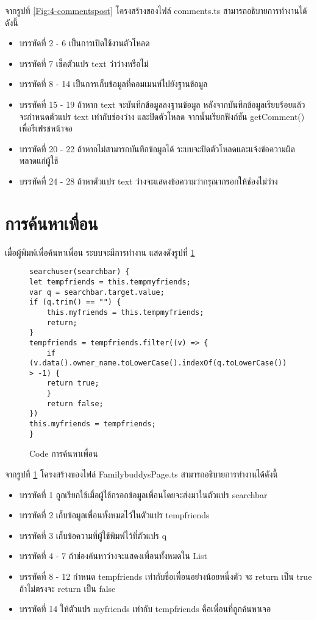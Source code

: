 จากรูปที่ \ref{Fig:4-commentspost} โครงสร้างของไฟล์ comments.ts สามารถอธิบายการทำงานได้ดังนี้
\begin{itemize}[label={--}]
\item บรรทัดที่ 2 - 6 เป็นการเปิดใช้งานตัวโหลด
\item บรรทัดที่ 7 เช็คตัวแปร text ว่าว่างหรือไม่
\item บรรทัดที่ 8 - 14 เป็นการเก็บข้อมูลที่คอมเมนท์ไปยังฐานข้อมูล
\item บรรทัดที่ 15 - 19 ถ้าหาก text จะบันทึกข้อมูลลงฐานข้อมูล หลังจากบันทึกข้อมูลเรียบร้อยแล้ว จะกำหนดตัวแปร text เท่ากับช่องว่าง และปิดตัวโหลด จากนั้นเรียกฟังก์ชัน getComment() เพื่อรีเฟรชหน้าจอ
\item บรรทัดที่ 20 - 22 ถ้าหากไม่สามารถบันทึกข้อมูลได้ ระบบจะปิดตัวโหลดและแจ้งข้อความผิดพลาดแก่ผู้ใช้
\item บรรทัดที่ 24 - 28 ถ้าหาตัวแปร text ว่างจะแสดงข้อความว่ากรุณากรอกให้ช่องไม่ว่าง
\end{itemize}
\newpage





\section{การค้นหาเพื่อน}
เมื่อผู้พิมพ์เพื่อค้นหาเพื่อน ระบบจะมีการทำงาน แสดงดังรูปที่ \ref{Fig:4-addfamily}

\begin{figure}[H]
{\lstset{language=Pascal}
\begin{lstlisting}
searchuser(searchbar) {
let tempfriends = this.tempmyfriends;
var q = searchbar.target.value;
if (q.trim() == "") {
	this.myfriends = this.tempmyfriends;
	return;
}
tempfriends = tempfriends.filter((v) => {
	if (v.data().owner_name.toLowerCase().indexOf(q.toLowerCase()) > -1) {
	return true;
	}
	return false;
})
this.myfriends = tempfriends;
}
\end{lstlisting}}
\caption{Code การค้นหาเพื่อน}
\label{Fig:4-addfamily}
\end{figure}

จากรูปที่ \ref{Fig:4-addfamily} โครงสร้างของไฟล์ FamilybuddysPage.ts สามารถอธิบายการทำงานได้ดังนี้
\begin{itemize}[label={--}]
\item บรรทัดที่ 1 ถูกเรียกใช้เมื่อผู้ใช้กรอกข้อมูลเพื่อนโดยจะส่งมาในตัวแปร searchbar
\item บรรทัดที่ 2 เก็บข้อมูลเพื่อนทั้งหมดไว้ในตัวแปร tempfriends
\item บรรทัดที่ 3 เก็บข้อความที่ผู้ใช้พิมพ์ไว้ที่ตัวแปร q
\item บรรทัดที่ 4 - 7 ถ้าช่องค้นหาว่างจะแสดงเพื่อนทั้งหมดใน List
\item บรรทัดที่ 8 - 12 กำหนด tempfriends เท่ากับชื่อเพื่อนอย่างน้อยหนึ่งตัว จะ return เป็น true ถ้าไม่ตรงจะ return เป็น false
\item บรรทัดที่ 14 ให้ตัวแปร myfriends เท่ากับ tempfriends คือเพื่อนที่ถูกค้นหาเจอ
\end{itemize}
\newpage

